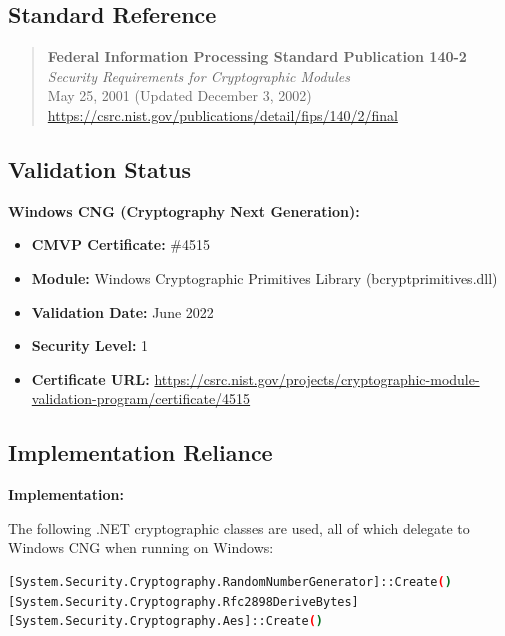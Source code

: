 \documentclass[11pt,letterpaper]{article}
\begin{document}
\subsection{Standard Reference}

\begin{quote}
\textbf{Federal Information Processing Standard Publication 140-2} \\
\textit{Security Requirements for Cryptographic Modules} \\
May 25, 2001 (Updated December 3, 2002) \\
\url{https://csrc.nist.gov/publications/detail/fips/140/2/final}
\end{quote}

\subsection{Validation Status}

\textbf{Windows CNG (Cryptography Next Generation):}
\begin{itemize}
    \item \textbf{CMVP Certificate:} \#4515
    \item \textbf{Module:} Windows Cryptographic Primitives Library (bcryptprimitives.dll)
    \item \textbf{Validation Date:} June 2022
    \item \textbf{Security Level:} 1
    \item \textbf{Certificate URL:} \url{https://csrc.nist.gov/projects/cryptographic-module-validation-program/certificate/4515}
\end{itemize}

\subsection{Implementation Reliance}

\textbf{Implementation:}

The following .NET cryptographic classes are used, all of which delegate to Windows CNG when running on Windows:

\begin{samepage}
\begin{lstlisting}[language=bash]
[System.Security.Cryptography.RandomNumberGenerator]::Create()
[System.Security.Cryptography.Rfc2898DeriveBytes]
[System.Security.Cryptography.Aes]::Create()
\end{lstlisting}
\end{samepage}
\end{document}
